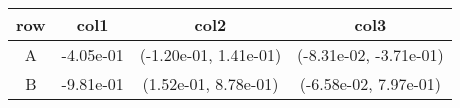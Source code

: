 \begin{tabular}{cccc}
\toprule
row&col1&col2&col3\tabularnewline
\midrule
A&-4.05e-01& (-1.20e-01, 1.41e-01)& (-8.31e-02, -3.71e-01)\tabularnewline
B&-9.81e-01& (1.52e-01, 8.78e-01)& (-6.58e-02, 7.97e-01)\tabularnewline
\bottomrule
\end{tabular}
